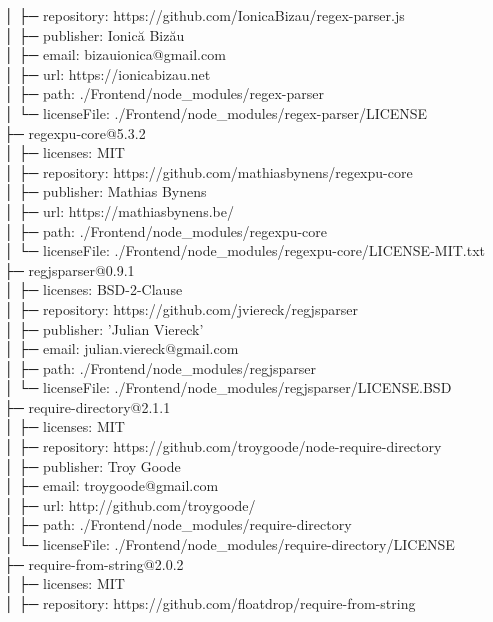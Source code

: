 │  ├─ repository: https://github.com/IonicaBizau/regex-parser.js\\
│  ├─ publisher: Ionică Bizău\\
│  ├─ email: bizauionica@gmail.com\\
│  ├─ url: https://ionicabizau.net\\
│  ├─ path: ./Frontend/node\_modules/regex-parser\\
│  └─ licenseFile: ./Frontend/node\_modules/regex-parser/LICENSE\\
├─ regexpu-core@5.3.2\\
│  ├─ licenses: MIT\\
│  ├─ repository: https://github.com/mathiasbynens/regexpu-core\\
│  ├─ publisher: Mathias Bynens\\
│  ├─ url: https://mathiasbynens.be/\\
│  ├─ path: ./Frontend/node\_modules/regexpu-core\\
│  └─ licenseFile: ./Frontend/node\_modules/regexpu-core/LICENSE-MIT.txt\\
├─ regjsparser@0.9.1\\
│  ├─ licenses: BSD-2-Clause\\
│  ├─ repository: https://github.com/jviereck/regjsparser\\
│  ├─ publisher: 'Julian Viereck'\\
│  ├─ email: julian.viereck@gmail.com\\
│  ├─ path: ./Frontend/node\_modules/regjsparser\\
│  └─ licenseFile: ./Frontend/node\_modules/regjsparser/LICENSE.BSD\\
├─ require-directory@2.1.1\\
│  ├─ licenses: MIT\\
│  ├─ repository: https://github.com/troygoode/node-require-directory\\
│  ├─ publisher: Troy Goode\\
│  ├─ email: troygoode@gmail.com\\
│  ├─ url: http://github.com/troygoode/\\
│  ├─ path: ./Frontend/node\_modules/require-directory\\
│  └─ licenseFile: ./Frontend/node\_modules/require-directory/LICENSE\\
├─ require-from-string@2.0.2\\
│  ├─ licenses: MIT\\
│  ├─ repository: https://github.com/floatdrop/require-from-string\\
